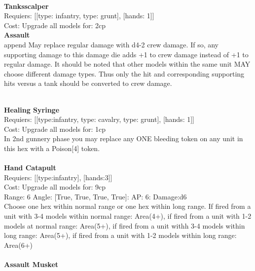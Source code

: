 \ \\
{\bf Tanksscalper } \\

Requiers: [[type: infantry, type: grunt], [hands: 1]] \\
Cost: Upgrade all models for: 2cp \\




{\bf Assault} \ \\

append May replace regular damage with d4-2 crew damage. If so, any supporting damage to this damage die adds +1 to crew damage instead of +1 to regular damage. It should be noted that other models within the same unit MAY choose different damage types. Thus only the hit and corresponding supporting hits versus a tank should be converted to crew damage.


\ \\
{\bf Healing Syringe } \\

Requiers: [[type:infantry, type: cavalry, type: grunt], [hands: 1]] \\
Cost: Upgrade all models for: 1cp \\
In 2nd gunnery phase you may replace any ONE bleeding token on any unit in this hex with a Poison[4] token.\\ 









\ \\
{\bf Hand Catapult } \\

Requiers: [[type:infantry], [hands:3]] \\
Cost: Upgrade all models for: 9cp \\


Range: 6  Angle: [True, True, True, True]: AP: 6: Damage:d6 \\
Choose one hex within normal range or one hex within long range. If fired from a unit with 3-4 models within normal range: Area(4+), if fired from a unit with 1-2 models at normal range: Area(5+), if fired from a unit withh 3-4 models within long range: Area(5+), if fired from a unit with 1-2 models within long range: Area(6+)\\ 








\ \\
{\bf Assault Musket } \\

